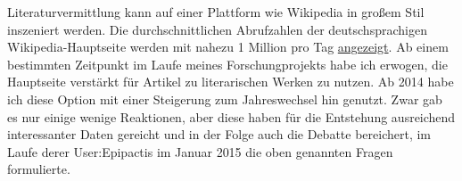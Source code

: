 \documentclass[fontsize=12pt]{scrartcl}
\begin{document}
Li\-te\-ra\-tur\-ver\-mitt\-lung kann auf einer Plattform wie Wi\-ki\-pe\-dia in gro{\ss}em Stil inszeniert werden. Die durch\-schnitt\-li\-chen Abrufzahlen der deutschspra\-chi\-gen Wi\-ki\-pe\-dia-Hauptseite werden mit nahezu 1 Million pro Tag \href{http://stats.grok.se/de/latest90/Wikipedia:Hauptseite}{angezeigt}. Ab einem bestimmten Zeitpunkt im Laufe meines For\-schungprojekts habe ich erwogen, die Hauptseite verst\"arkt f\"ur Artikel zu li\-te\-ra\-rischen Werken zu nutzen. Ab 2014 habe ich diese Option mit einer Steigerung zum Jahreswechsel hin genutzt. Zwar gab es nur einige wenige Reaktionen, aber diese haben f\"ur die Entstehung ausreichend interessanter Daten gereicht und in der Folge auch die Debatte bereichert, im Laufe derer \mbox{User}:Epipactis im Januar 2015 die oben genannten Fragen formulierte.
 
\end{document}
